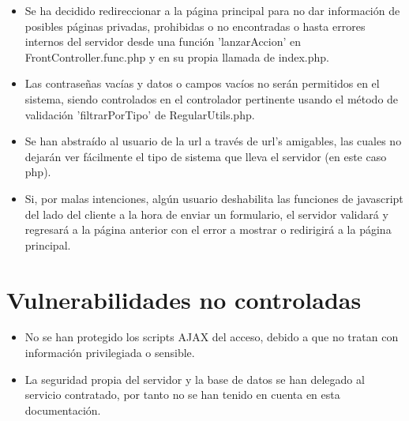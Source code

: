 \begin{itemize}
\item Se ha decidido redireccionar a la p\'{a}gina principal para no dar informaci\'{o}n de posibles p\'{a}ginas privadas, prohibidas o no encontradas o hasta errores internos del servidor desde una funci\'{o}n 'lanzarAccion' en FrontController.func.php y en su propia llamada de index.php.

\item Las contrase\~{n}as vac\'{i}as y datos o campos vac\'{i}os no ser\'{a}n permitidos en el sistema, siendo controlados en el controlador pertinente usando el m\'{e}todo de validaci\'{o}n 'filtrarPorTipo' de RegularUtils.php.

\item Se han abstra\'{i}do al usuario de la url a trav\'{e}s de url's amigables, las cuales no dejar\'{a}n ver f\'{a}cilmente el tipo de sistema que lleva el servidor (en este caso php).

\item Si, por malas intenciones, alg\'{u}n usuario deshabilita las funciones de javascript del lado del cliente a la hora de enviar un formulario, el servidor validará y regresará a la página anterior con el error a mostrar o redirigirá a la página principal.

\end{itemize}
\section{Vulnerabilidades no controladas}

\begin{itemize}
\item No se han protegido los scripts AJAX del acceso, debido a que no tratan con informaci\'{o}n privilegiada o sensible.
\item La seguridad propia del servidor y la base de datos se han delegado al servicio contratado, por tanto no se han tenido en cuenta en esta documentaci\'{o}n.
\end{itemize}



